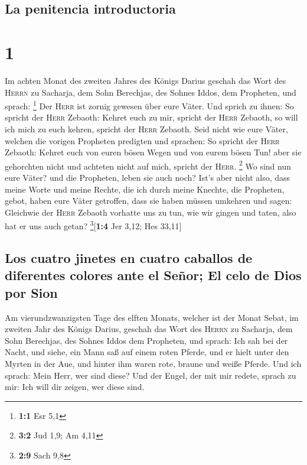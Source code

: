 \hypertarget{la-penitencia-introductoria}{%
\subsection{La penitencia
introductoria}\label{la-penitencia-introductoria}}

\hypertarget{section}{%
\section{1}\label{section}}

 Im achten Monat des zweiten Jahres des Königs Darius
geschah das Wort des \textsc{Herrn} zu Sacharja, dem Sohn Berechjas, des
Sohnes Iddos, dem Propheten, und sprach: \footnote{\textbf{1:1} Esr 5,1}
 Der \textsc{Herr} ist zornig gewesen über eure Väter.
 Und sprich zu ihnen: So spricht der \textsc{Herr}
Zebaoth: Kehret euch zu mir, spricht der \textsc{Herr} Zebaoth, so will
ich mich zu euch kehren, spricht der \textsc{Herr} Zebaoth.
 Seid nicht wie eure Väter, welchen die vorigen Propheten
predigten und sprachen: So spricht der \textsc{Herr} Zebaoth: Kehret
euch von euren bösen Wegen und von eurem bösen Tun! aber sie gehorchten
nicht und achteten nicht auf mich, spricht der \textsc{Herr}.
\footnote{\textbf{3:2} Jud 1,9; Am 4,11}  Wo sind nun eure
Väter? und die Propheten, leben sie auch noch?  Ist's aber
nicht also, dass meine Worte und meine Rechte, die ich durch meine
Knechte, die Propheten, gebot, haben eure Väter getroffen, dass sie
haben müssen umkehren und sagen: Gleichwie der \textsc{Herr} Zebaoth
vorhatte uns zu tun, wie wir gingen und taten, also hat er uns auch
getan? \footnote{\textbf{2:9} Sach 9,8}{[}\textbf{1:4} Jer 3,12; Hes
33,11{]}

\hypertarget{los-cuatro-jinetes-en-cuatro-caballos-de-diferentes-colores-ante-el-seuxf1or-el-celo-de-dios-por-sion}{%
\subsection{Los cuatro jinetes en cuatro caballos de diferentes colores
ante el Señor; El celo de Dios por
Sion}\label{los-cuatro-jinetes-en-cuatro-caballos-de-diferentes-colores-ante-el-seuxf1or-el-celo-de-dios-por-sion}}

 Am vierundzwanzigsten Tage des elften Monats, welcher ist
der Monat Sebat, im zweiten Jahr des Königs Darius, geschah das Wort des
\textsc{Herrn} zu Sacharja, dem Sohn Berechjas, des Sohnes Iddos dem
Propheten, und sprach:  Ich sah bei der Nacht, und siehe,
ein Mann saß auf einem roten Pferde, und er hielt unter den Myrten in
der Aue, und hinter ihm waren rote, braune und weiße Pferde.
 Und ich sprach: Mein Herr, wer sind diese? Und der Engel,
der mit mir redete, sprach zu mir: Ich will dir zeigen, wer diese sind.

